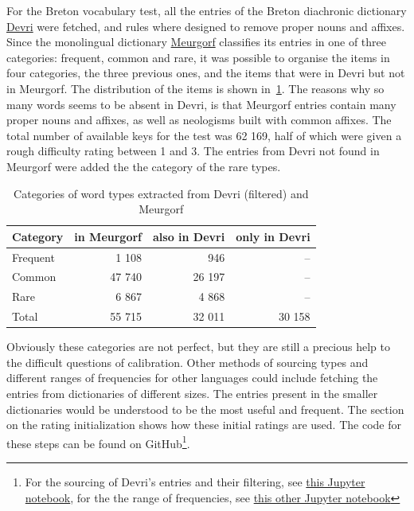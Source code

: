For the Breton vocabulary test, all the entries of the Breton diachronic dictionary \href{https://devri.bzh/}{Devri} were fetched, and rules where designed to remove proper nouns and affixes. Since the monolingual dictionary \href{https://niverel.brezhoneg.bzh/br/meurgorf/}{Meurgorf} classifies its entries in one of three categories: frequent, common and rare, it was possible to organise the items in four categories, the three previous ones, and the items that were in Devri but not in Meurgorf. The distribution of the items is shown in~\ref{tab:breton-types}. The reasons why so many words seems to be absent in Devri, is that Meurgorf entries contain many proper nouns and affixes, as well as neologisms built with common affixes. The total number of available keys for the test was 62 169, half of which were given a rough difficulty rating between 1 and 3. The entries from Devri not found in Meurgorf were added the the category of the rare types.

\begin{table}[htbp]
    \centering
    \begin{tabular}{l|r|r|r}
        \textbf{Category} & \textbf{in Meurgorf} & \textbf{also in Devri} & \textbf{only in Devri} \\
        \hline
        Frequent & 1 108 & 946 & – \\
        Common & 47 740 & 26 197 & – \\
        Rare & 6 867 & 4 868 & – \\
        Total & 55 715 & 32 011 & 30 158 \\
    \end{tabular}
    \caption{Categories of word types extracted from Devri (filtered) and Meurgorf}
    \label{tab:breton-types}
\end{table}

Obviously these categories are not perfect, but they are still a precious help to the difficult questions of calibration. Other methods of sourcing types and different ranges of frequencies for other languages could include fetching the entries from dictionaries of different sizes. The entries present in the smaller dictionaries would be understood to be the most useful and frequent. The section on the rating initialization shows how these initial ratings are used. The code for these steps can be found on GitHub\footnote{For the sourcing of Devri's entries and their filtering, see \href{https://github.com/Oktogazh/sudogen/blob/master/1\%20Introduction.ipynb}{this Jupyter notebook}, for the the range of frequencies, see \href{https://github.com/Oktogazh/sudogen/blob/master/locales/br/5\%20Initialization.ipynb}{this other Jupyter notebook}}.


